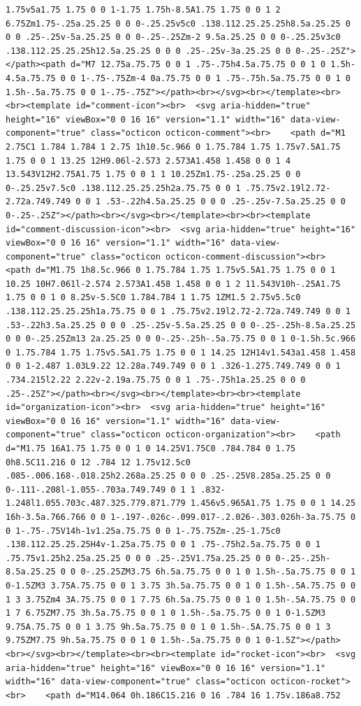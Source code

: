 \documentclass[
  letterpaper,
]{book}
\begin{document}
\begin{verbatim}
1.75v5a1.75 1.75 0 0 1-1.75 1.75h-8.5A1.75 1.75 0 0 1 2 6.75Zm1.75-.25a.25.25 0 0 0-.25.25v5c0 .138.112.25.25.25h8.5a.25.25 0 0 0 .25-.25v-5a.25.25 0 0 0-.25-.25Zm-2 9.5a.25.25 0 0 0-.25.25v3c0 .138.112.25.25.25h12.5a.25.25 0 0 0 .25-.25v-3a.25.25 0 0 0-.25-.25Z"></path><path d="M7 12.75a.75.75 0 0 1 .75-.75h4.5a.75.75 0 0 1 0 1.5h-4.5a.75.75 0 0 1-.75-.75Zm-4 0a.75.75 0 0 1 .75-.75h.5a.75.75 0 0 1 0 1.5h-.5a.75.75 0 0 1-.75-.75Z"></path><br></svg><br></template><br><br><template id="comment-icon"><br>  <svg aria-hidden="true" height="16" viewBox="0 0 16 16" version="1.1" width="16" data-view-component="true" class="octicon octicon-comment"><br>    <path d="M1 2.75C1 1.784 1.784 1 2.75 1h10.5c.966 0 1.75.784 1.75 1.75v7.5A1.75 1.75 0 0 1 13.25 12H9.06l-2.573 2.573A1.458 1.458 0 0 1 4 13.543V12H2.75A1.75 1.75 0 0 1 1 10.25Zm1.75-.25a.25.25 0 0 0-.25.25v7.5c0 .138.112.25.25.25h2a.75.75 0 0 1 .75.75v2.19l2.72-2.72a.749.749 0 0 1 .53-.22h4.5a.25.25 0 0 0 .25-.25v-7.5a.25.25 0 0 0-.25-.25Z"></path><br></svg><br></template><br><br><template id="comment-discussion-icon"><br>  <svg aria-hidden="true" height="16" viewBox="0 0 16 16" version="1.1" width="16" data-view-component="true" class="octicon octicon-comment-discussion"><br>    <path d="M1.75 1h8.5c.966 0 1.75.784 1.75 1.75v5.5A1.75 1.75 0 0 1 10.25 10H7.061l-2.574 2.573A1.458 1.458 0 0 1 2 11.543V10h-.25A1.75 1.75 0 0 1 0 8.25v-5.5C0 1.784.784 1 1.75 1ZM1.5 2.75v5.5c0 .138.112.25.25.25h1a.75.75 0 0 1 .75.75v2.19l2.72-2.72a.749.749 0 0 1 .53-.22h3.5a.25.25 0 0 0 .25-.25v-5.5a.25.25 0 0 0-.25-.25h-8.5a.25.25 0 0 0-.25.25Zm13 2a.25.25 0 0 0-.25-.25h-.5a.75.75 0 0 1 0-1.5h.5c.966 0 1.75.784 1.75 1.75v5.5A1.75 1.75 0 0 1 14.25 12H14v1.543a1.458 1.458 0 0 1-2.487 1.03L9.22 12.28a.749.749 0 0 1 .326-1.275.749.749 0 0 1 .734.215l2.22 2.22v-2.19a.75.75 0 0 1 .75-.75h1a.25.25 0 0 0 .25-.25Z"></path><br></svg><br></template><br><br><template id="organization-icon"><br>  <svg aria-hidden="true" height="16" viewBox="0 0 16 16" version="1.1" width="16" data-view-component="true" class="octicon octicon-organization"><br>    <path d="M1.75 16A1.75 1.75 0 0 1 0 14.25V1.75C0 .784.784 0 1.75 0h8.5C11.216 0 12 .784 12 1.75v12.5c0 .085-.006.168-.018.25h2.268a.25.25 0 0 0 .25-.25V8.285a.25.25 0 0 0-.111-.208l-1.055-.703a.749.749 0 1 1 .832-1.248l1.055.703c.487.325.779.871.779 1.456v5.965A1.75 1.75 0 0 1 14.25 16h-3.5a.766.766 0 0 1-.197-.026c-.099.017-.2.026-.303.026h-3a.75.75 0 0 1-.75-.75V14h-1v1.25a.75.75 0 0 1-.75.75Zm-.25-1.75c0 .138.112.25.25.25H4v-1.25a.75.75 0 0 1 .75-.75h2.5a.75.75 0 0 1 .75.75v1.25h2.25a.25.25 0 0 0 .25-.25V1.75a.25.25 0 0 0-.25-.25h-8.5a.25.25 0 0 0-.25.25ZM3.75 6h.5a.75.75 0 0 1 0 1.5h-.5a.75.75 0 0 1 0-1.5ZM3 3.75A.75.75 0 0 1 3.75 3h.5a.75.75 0 0 1 0 1.5h-.5A.75.75 0 0 1 3 3.75Zm4 3A.75.75 0 0 1 7.75 6h.5a.75.75 0 0 1 0 1.5h-.5A.75.75 0 0 1 7 6.75ZM7.75 3h.5a.75.75 0 0 1 0 1.5h-.5a.75.75 0 0 1 0-1.5ZM3 9.75A.75.75 0 0 1 3.75 9h.5a.75.75 0 0 1 0 1.5h-.5A.75.75 0 0 1 3 9.75ZM7.75 9h.5a.75.75 0 0 1 0 1.5h-.5a.75.75 0 0 1 0-1.5Z"></path><br></svg><br></template><br><br><template id="rocket-icon"><br>  <svg aria-hidden="true" height="16" viewBox="0 0 16 16" version="1.1" width="16" data-view-component="true" class="octicon octicon-rocket"><br>    <path d="M14.064 0h.186C15.216 0 16 .784 16 1.75v.186a8.752 
\end{verbatim}
\end{document}
